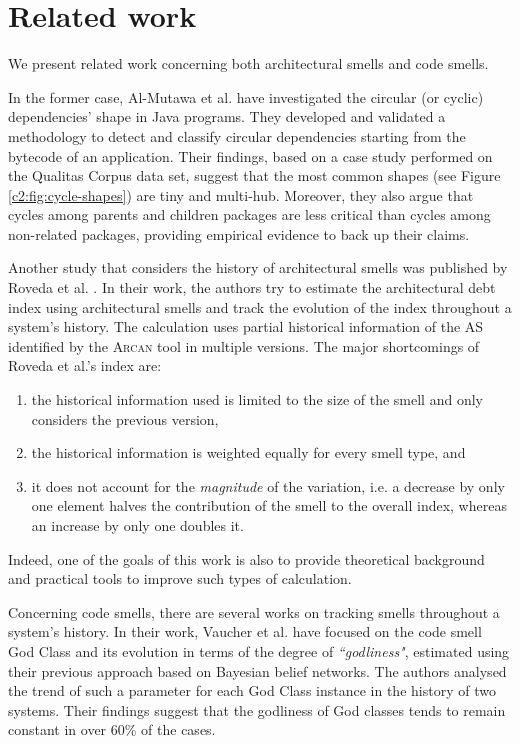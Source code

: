 \section{Related work}\label{c2:sec:related-work}
We present related work concerning both architectural smells and code smells.

In the former case, Al-Mutawa et al. \cite{AlMutawa2014} have investigated the circular (or cyclic) dependencies' shape in Java programs. 
They developed and validated a methodology to detect and classify circular dependencies starting from the bytecode of an application.
Their findings, based on a case study performed on the Qualitas Corpus \cite{QualitasCorpus2010} data set, suggest that the most common shapes (see Figure \ref{c2:fig:cycle-shapes}) are tiny and multi-hub. Moreover, they also argue that cycles among parents and children packages are less critical than cycles among non-related packages, providing empirical evidence to back up their claims.

Another study that considers the history of architectural smells was published by Roveda et al. \cite{Roveda2018}.
In their work, the authors try to estimate the architectural debt index using architectural smells and track the evolution of the index throughout a system's history.
The calculation uses partial historical information of the AS identified by the \textsc{Arcan} tool in multiple versions.
The major shortcomings of Roveda et al.'s index are:
\begin{enumerate}[label=(\roman*)]
    \item the historical information used is limited to the size of the smell and only considers the previous version,
    \item the historical information is weighted equally for every smell type, and
    \item it does not account for the \emph{magnitude} of the variation, i.e. a decrease by only one element halves the contribution of the smell to the overall index, whereas an increase by only one doubles it.
\end{enumerate}
Indeed, one of the goals of this work is also to provide theoretical background and practical tools to improve such types of calculation.

Concerning code smells, there are several works on tracking smells throughout a system's history.
In their work, Vaucher et al. \cite{Vaucher2009} have focused on the code smell God Class and its evolution in terms of the degree of \textit{``godliness"}, estimated using their previous approach based on Bayesian belief networks.
The authors analysed the trend of such a parameter for each God Class instance in the history of two systems. Their findings suggest that the godliness of God classes tends to remain constant in over 60\% of the cases.

